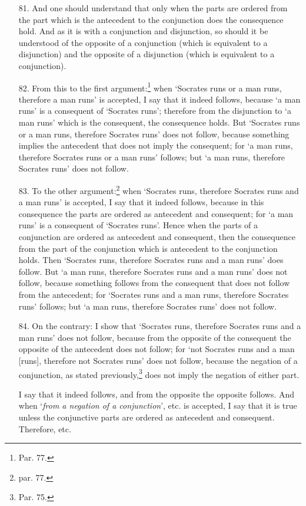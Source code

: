 \documentclass[]{article}
\begin{document}
\begin{enumerate}
\item[81.] And one should understand that only when the parts are ordered from the part which is the antecedent to the conjunction does the consequence hold. And as it is with a conjunction and disjunction, so should it be understood of the opposite of a conjunction (which is equivalent to a disjunction) and the opposite of a disjunction (which is equivalent to a conjunction).
\item[82.] From this to the first argument:\footnote{Par. 77.} when `Socrates runs or a man runs, therefore a man runs' is accepted, I say that it indeed follows, because `a man runs' is a consequent of `Socrates runs'; therefore from the disjunction to `a man runs' which is the consequent, the consequence holds. But `Socrates runs or a man runs, therefore Socrates runs' does not follow, because something implies the antecedent that does not imply the consequent; for `a man runs, therefore Socrates runs or a man runs' follows; but `a man runs, therefore Socrates runs' does not follow.
\item[83.] To the other argument:\footnote{par. 77.} when `Socrates runs, therefore Socrates runs and a man runs' is accepted, I say that it indeed follows, because in this consequence the parts are ordered as antecedent and consequent; for `a man runs' is a consequent of `Socrates runs'. Hence when the parts of a conjunction are ordered as antecedent and consequent, then the consequence from the part of the conjunction which is antecedent to the conjunction holds. Then `Socrates runs, therefore Socrates runs and a man runs' does follow. But `a man runs, therefore Socrates runs and a man runs' does not follow, because something follows from the consequent that does not follow from the antecedent; for `Socrates runs and a man runs, therefore Socrates runs' follows; but `a man runs, therefore Socrates runs' does not follow.
\item[84.] On the contrary: I show that `Socrates runs, therefore Socrates runs and a man runs' does not follow, because from the opposite of the consequent the opposite of the antecedent does not follow; for `not Socrates runs and a man [runs], therefore not Socrates runs' does not follow, because the negation of a conjunction, as stated previously,\footnote{Par. 75.} does not imply the negation of either part.

I say that it indeed follows, and from the opposite the opposite follows. And when `\textit{from a negation of a conjunction}', etc. is accepted, I say that it is true unless the conjunctive parts are ordered as antecedent and consequent. Therefore, etc.
\end{enumerate}
\end{document}
